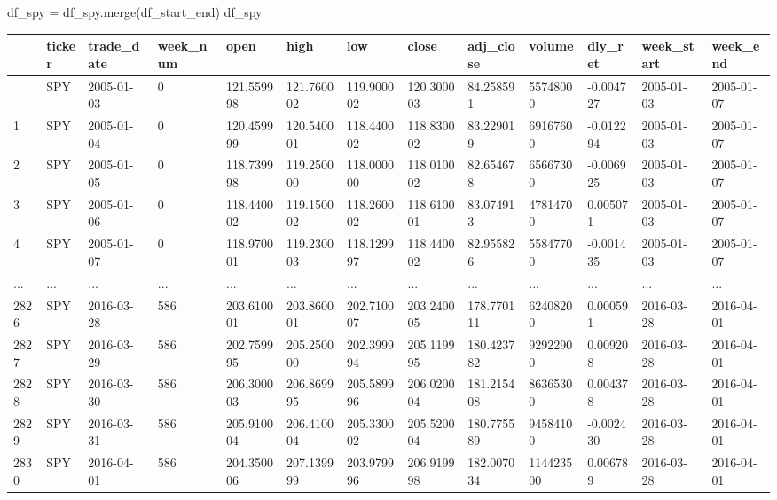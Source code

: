 \documentclass[
  letterpaper,
  DIV=11,
  numbers=noendperiod]{scrreprt}
\newenvironment{Shaded}{\begin{snugshade}}{\end{snugshade}}
\newcommand{\NormalTok}[1]{\textcolor[rgb]{0.00,0.23,0.31}{#1}}
\newcommand{\OperatorTok}[1]{\textcolor[rgb]{0.37,0.37,0.37}{#1}}
\begin{document}
\begin{Shaded}
\begin{Highlighting}[]
\NormalTok{df\_spy }\OperatorTok{=}\NormalTok{ df\_spy.merge(df\_start\_end)}
\NormalTok{df\_spy}
\end{Highlighting}
\end{Shaded}

\begin{longtable}[]{@{}lllllllllllll@{}}
\toprule\noalign{}
& ticker & trade\_date & week\_num & open & high & low & close &
adj\_close & volume & dly\_ret & week\_start & week\_end \\
\midrule\noalign{}
\endhead
\bottomrule\noalign{}
\endlastfoot
0 & SPY & 2005-01-03 & 0 & 121.559998 & 121.760002 & 119.900002 &
120.300003 & 84.258591 & 55748000 & -0.004727 & 2005-01-03 &
2005-01-07 \\
1 & SPY & 2005-01-04 & 0 & 120.459999 & 120.540001 & 118.440002 &
118.830002 & 83.229019 & 69167600 & -0.012294 & 2005-01-03 &
2005-01-07 \\
2 & SPY & 2005-01-05 & 0 & 118.739998 & 119.250000 & 118.000000 &
118.010002 & 82.654678 & 65667300 & -0.006925 & 2005-01-03 &
2005-01-07 \\
3 & SPY & 2005-01-06 & 0 & 118.440002 & 119.150002 & 118.260002 &
118.610001 & 83.074913 & 47814700 & 0.005071 & 2005-01-03 &
2005-01-07 \\
4 & SPY & 2005-01-07 & 0 & 118.970001 & 119.230003 & 118.129997 &
118.440002 & 82.955826 & 55847700 & -0.001435 & 2005-01-03 &
2005-01-07 \\
... & ... & ... & ... & ... & ... & ... & ... & ... & ... & ... & ... &
... \\
2826 & SPY & 2016-03-28 & 586 & 203.610001 & 203.860001 & 202.710007 &
203.240005 & 178.770111 & 62408200 & 0.000591 & 2016-03-28 &
2016-04-01 \\
2827 & SPY & 2016-03-29 & 586 & 202.759995 & 205.250000 & 202.399994 &
205.119995 & 180.423782 & 92922900 & 0.009208 & 2016-03-28 &
2016-04-01 \\
2828 & SPY & 2016-03-30 & 586 & 206.300003 & 206.869995 & 205.589996 &
206.020004 & 181.215408 & 86365300 & 0.004378 & 2016-03-28 &
2016-04-01 \\
2829 & SPY & 2016-03-31 & 586 & 205.910004 & 206.410004 & 205.330002 &
205.520004 & 180.775589 & 94584100 & -0.002430 & 2016-03-28 &
2016-04-01 \\
2830 & SPY & 2016-04-01 & 586 & 204.350006 & 207.139999 & 203.979996 &
206.919998 & 182.007034 & 114423500 & 0.006789 & 2016-03-28 &
2016-04-01 \\
\end{longtable}
\end{document}
